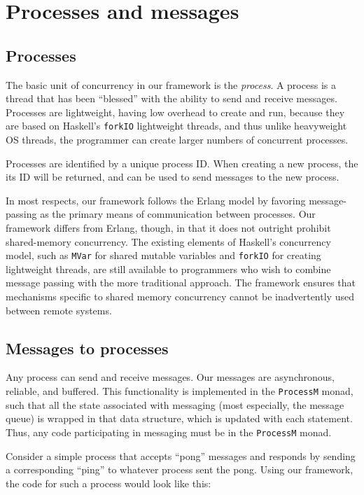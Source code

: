 \documentclass[preprint]{sigplanconf}
\begin{document}
\section{Processes and messages}

\subsection{Processes}
The basic unit of concurrency in our framework is the {\em process}. A process is a thread that has been ``blessed'' with the ability to send and receive messages. Processes are lightweight, having low overhead to create and run, because they are based on Haskell's \texttt{forkIO} lightweight threads, and thus unlike heavyweight OS threads, the programmer can create larger numbers of concurrent processes.

Processes are identified by a unique process ID. When creating a new process, the its ID will be returned, and can be used to send messages to the new process.

In most respects, our framework follows the Erlang model by favoring message-passing as the primary means of communication between processes. Our framework differs from Erlang, though, in that it does not outright prohibit shared-memory concurrency. The existing elements of Haskell's concurrency model, such as \texttt{MVar} for shared mutable variables and \texttt{forkIO} for creating lightweight threads, are still available to programmers who wish to combine message passing with the more traditional approach. The framework ensures that mechanisms specific to shared memory concurrency cannot be inadvertently used between remote systems. 

\subsection{Messages to processes}

Any process can send and receive messages. Our messages are asynchronous, reliable, and buffered. This functionality is implemented in the \texttt{ProcessM} monad, such that all the state associated with messaging (most especially, the message queue) is wrapped in that data structure, which is updated with each statement. Thus, any code participating in messaging must be in the \texttt{ProcessM} monad.

Consider a simple process that accepts ``pong'' messages and responds by sending a corresponding ``ping'' to whatever process sent the pong. Using our framework, the code for such a process would look like this:
\end{document}
